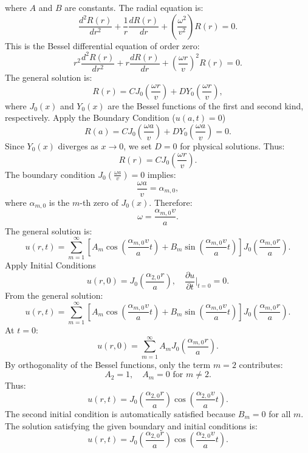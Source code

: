 \documentclass[12pt]{article}
\begin{document}
        where \( A \) and \( B \) are constants.
        The radial equation is:
        \[
        \frac{d^2 R(r)}{dr^2} + \frac{1}{r} \frac{dR(r)}{dr} + \left( \frac{\omega^2}{v^2} \right) R(r) = 0.
        \]
        This is the Bessel differential equation of order zero:
        \[
        r^2 \frac{d^2 R(r)}{dr^2} + r \frac{dR(r)}{dr} + \left( \frac{\omega r}{v} \right)^2 R(r) = 0.
        \]
        The general solution is:
        \[
        R(r) = C J_0\left( \frac{\omega r}{v} \right) + D Y_0\left( \frac{\omega r}{v} \right),
        \]
        where \( J_0(x) \) and \( Y_0(x) \) are the Bessel functions of the first and second kind, respectively.
        Apply the Boundary Condition (\( u(a, t) = 0 \))
        \[
        R(a) = C J_0\left( \frac{\omega a}{v} \right) + D Y_0\left( \frac{\omega a}{v} \right) = 0.
        \]
        Since \( Y_0(x) \) diverges as \( x \to 0 \), we set \( D = 0 \) for physical solutions. Thus:
        \[
        R(r) = C J_0\left( \frac{\omega r}{v} \right).
        \]
        The boundary condition \( J_0\left( \frac{\omega a}{v} \right) = 0 \) implies:
        \[
        \frac{\omega a}{v} = \alpha_{m,0},
        \]
        where \( \alpha_{m,0} \) is the \( m \)-th zero of \( J_0(x) \). Therefore:
        \[
        \omega = \frac{\alpha_{m,0} v}{a}.
        \]
        The general solution is:
        \[
        u(r, t) = \sum_{m=1}^\infty \left[ A_m \cos\left( \frac{\alpha_{m,0} v}{a} t \right) + B_m \sin\left( \frac{\alpha_{m,0} v}{a} t \right) \right] J_0\left( \frac{\alpha_{m,0} r}{a} \right).
        \]
        Apply Initial Conditions
        \[
        u(r, 0) = J_0\left( \frac{\alpha_{2,0} r}{a} \right), \quad \frac{\partial u}{\partial t} \bigg|_{t=0} = 0.
        \]
        From the general solution:
        \[
        u(r, t) = \sum_{m=1}^\infty \left[ A_m \cos\left( \frac{\alpha_{m,0} v}{a} t \right) + B_m \sin\left( \frac{\alpha_{m,0} v}{a} t \right) \right] J_0\left( \frac{\alpha_{m,0} r}{a} \right).
        \]
        At \( t = 0 \):
        \[
        u(r, 0) = \sum_{m=1}^\infty A_m J_0\left( \frac{\alpha_{m,0} r}{a} \right).
        \]
        By orthogonality of the Bessel functions, only the term \( m = 2 \) contributes:
        \[
        A_2 = 1, \quad A_m = 0 \text{ for } m \neq 2.
        \]
        Thus:
        \[
        u(r, t) = J_0\left( \frac{\alpha_{2,0} r}{a} \right) \cos\left( \frac{\alpha_{2,0} v}{a} t \right).
        \]
        The second initial condition is automatically satisfied because \( B_m = 0 \) for all \( m \).
        The solution satisfying the given boundary and initial conditions is:
        \[
        \boxed{u(r, t) = J_0\left( \frac{\alpha_{2,0} r}{a} \right) \cos\left( \frac{\alpha_{2,0} v}{a} t \right).}
        \]
\end{document}
